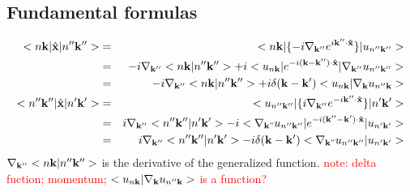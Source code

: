 \documentclass[aps,prb,preprint]{revtex4-1}
\begin{document}
\begin{appendix}
\section{Fundamental formulas}
\begin{eqnarray}
<n{\bf k}|\hat{\bf x}|n''{\bf k''}>&=& <n{\bf k}| \{ -i \nabla_{\bf k''} e^{i{\bf k'' \cdot \hat{x} }} \} |u_{n''{\bf k''}}>\nonumber \\
&=&  -i \nabla_{\bf k''} <n{\bf k}|n''{\bf k''}> + i <u_{n{\bf k}}| e^{-i{\bf (k-k'') \cdot \hat{x} }} |\nabla_{\bf k''} u_{n''{\bf k''}}>\nonumber \\
&=&  -i \nabla_{\bf k''} <n{\bf k}|n''{\bf k''}> + i\delta({\bf k-k'}) <u_{n{\bf k}}|\nabla_{\bf k} u_{n''{\bf k}}> \\
<n''{\bf k''}|\hat{\bf x}|n'{\bf k'}>&=& <u_{n''{\bf k''}}| \{ i \nabla_{\bf k''} e^{-i{\bf k'' \cdot \hat{x} }} \} |n'{\bf k'}>\nonumber \\
&=&  i \nabla_{\bf k''} <n''{\bf k''}|n'{\bf k'}> - i <\nabla_{\bf k"} u_{n''{\bf k''}}| e^{-i{\bf (k''-k') \cdot \hat{x} }} |u_{n'{\bf k'}}>\nonumber \\
&=&  i \nabla_{\bf k''} <n''{\bf k''}|n'{\bf k'}> - i\delta({\bf k-k'}) <\nabla_{\bf k"} u_{n''{\bf k''}}|u_{n'{\bf k'}}>\nonumber  
\end{eqnarray} 
$\nabla_{\bf k''} <n{\bf k}|n''{\bf k''}>$ is the derivative of the generalized function.
\textcolor{red}{note: delta fuction; momentum; $<u_{n{\bf k}}|\nabla_{\bf k} u_{n''{\bf k}}>$ is a function?}


\end{appendix}
\end{document}
